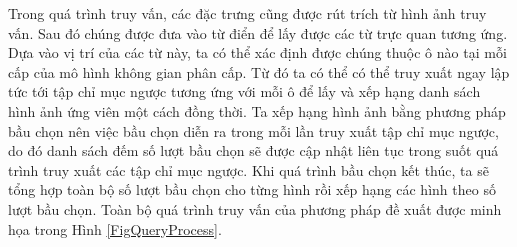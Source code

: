 Trong quá trình truy vấn, các đặc trưng cũng được rút trích từ hình ảnh truy vấn. Sau đó chúng được đưa vào từ điển để lấy được các từ trực quan tương ứng. Dựa vào vị trí của các từ này, ta có thể xác định được chúng thuộc ô nào tại mỗi cấp của mô hình không gian phân cấp. Từ đó ta có thể có thể truy xuất ngay lập tức tới tập chỉ mục ngược tương ứng với mỗi ô để lấy và xếp hạng danh sách hình ảnh ứng viên một cách đồng thời. Ta xếp hạng hình ảnh bằng phương pháp bầu chọn nên việc bầu chọn diễn ra trong mỗi lần truy xuất tập chỉ mục ngược, do đó danh sách đếm số lượt bầu chọn sẽ được cập nhật liên tục trong suốt quá trình truy xuất các tập chỉ mục ngược. Khi quá trình bầu chọn kết thúc, ta sẽ tổng hợp toàn bộ số lượt bầu chọn cho từng hình rồi xếp hạng các hình theo số lượt bầu chọn. Toàn bộ quá trình truy vấn của phương pháp đề xuất được minh họa trong Hình \ref{FigQueryProcess}.

